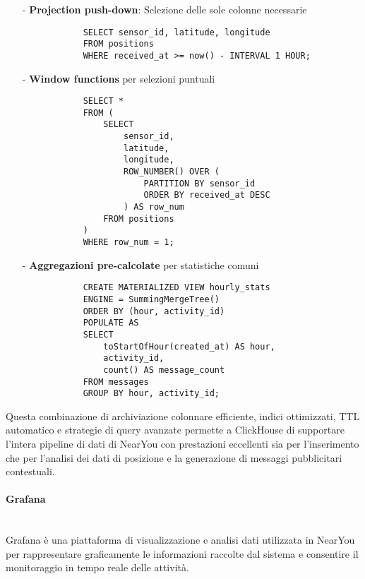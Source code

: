 \documentclass[10pt]{article}
\newcommand{\myparagraph}[1]{\paragraph{#1}\mbox{}\\}
\begin{document}
        \begin{itemize}
            \item[-] \textbf{Projection push-down}: Selezione delle sole colonne necessarie
            \begin{lstlisting}
            SELECT sensor_id, latitude, longitude 
            FROM positions 
            WHERE received_at >= now() - INTERVAL 1 HOUR;
            \end{lstlisting}
            
            \item[-] \textbf{Window functions} per selezioni puntuali
            \begin{lstlisting}
            SELECT *
            FROM (
                SELECT 
                    sensor_id, 
                    latitude, 
                    longitude, 
                    ROW_NUMBER() OVER (
                        PARTITION BY sensor_id 
                        ORDER BY received_at DESC
                    ) AS row_num
                FROM positions
            ) 
            WHERE row_num = 1;
            \end{lstlisting}
            
            \item[-] \textbf{Aggregazioni pre-calcolate} per statistiche comuni
            \begin{lstlisting}
            CREATE MATERIALIZED VIEW hourly_stats 
            ENGINE = SummingMergeTree()
            ORDER BY (hour, activity_id)
            POPULATE AS
            SELECT 
                toStartOfHour(created_at) AS hour,
                activity_id,
                count() AS message_count
            FROM messages
            GROUP BY hour, activity_id;
            \end{lstlisting}
        \end{itemize}
        
        Questa combinazione di archiviazione colonnare efficiente, indici ottimizzati, TTL automatico e strategie di query avanzate permette a ClickHouse di supportare l'intera pipeline di dati di NearYou con prestazioni eccellenti sia per l'inserimento che per l'analisi dei dati di posizione e la generazione di messaggi pubblicitari contestuali.
        

        \myparagraph{Grafana}
        Grafana è una piattaforma di visualizzazione e analisi dati utilizzata in NearYou per rappresentare graficamente le informazioni raccolte dal sistema e consentire il monitoraggio in tempo reale delle attività.
        
\end{document}
